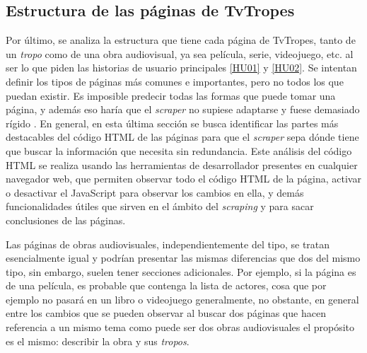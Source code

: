 \subsection{Estructura de las páginas de TvTropes}
Por último, se analiza la estructura que tiene cada página de TvTropes, tanto de
un \textit{tropo} como de una obra audiovisual, ya sea película, serie,
videojuego, etc. al ser lo que piden las historias de usuario principales
\href{https://github.com/jlgallego99/TropesToGo/issues/6}{[HU01]} y
\href{https://github.com/jlgallego99/TropesToGo/issues/7}{[HU02]}. Se intentan
definir los tipos de páginas más comunes e importantes, pero no todos los que
puedan existir. Es imposible predecir todas las formas que puede tomar una
página, y además eso haría que el \textit{scraper} no supiese adaptarse y fuese
demasiado rígido \cite{nishalscraping}. En general, en esta última sección se
busca identificar las partes más destacables del código HTML de las páginas para
que el \textit{scraper} sepa dónde tiene que buscar la información que necesita
sin redundancia. Este análisis del código HTML se realiza usando las
herramientas de desarrollador presentes en cualquier navegador web, que permiten
observar todo el código HTML de la página, activar o desactivar el JavaScript
para observar los cambios en ella, y demás funcionalidades útiles que sirven en
el ámbito del \textit{scraping} y para sacar conclusiones de las páginas.

Las páginas de obras audiovisuales, independientemente del tipo, se tratan
esencialmente igual y podrían presentar las mismas diferencias que dos del mismo
tipo, sin embargo, suelen tener secciones adicionales. Por ejemplo, si la página
es de una película, es probable que contenga la lista de actores, cosa que por
ejemplo no pasará en un libro o videojuego generalmente, no obstante, en general
entre los cambios que se pueden observar al buscar dos páginas que hacen
referencia a un mismo tema como puede ser dos obras audiovisuales el propósito
es el mismo: describir la obra y sus \textit{tropos}.


